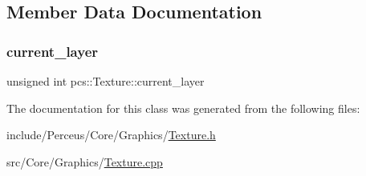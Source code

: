 \subsection{Member Data Documentation}
\mbox{\label{classpcs_1_1Texture_a6308be3376398be4188f5bbed20c5a90}} 
\subsubsection{\texorpdfstring{current\+\_\+layer}{current\_layer}}
{\footnotesize\ttfamily unsigned int pcs\+::\+Texture\+::current\+\_\+layer\hspace{0.3cm}{\ttfamily [private]}}



The documentation for this class was generated from the following files\+:\begin{DoxyCompactItemize}
\item 
include/\+Perceus/\+Core/\+Graphics/\hyperlink{Texture_8h}{Texture.\+h}\item 
src/\+Core/\+Graphics/\hyperlink{Texture_8cpp}{Texture.\+cpp}\end{DoxyCompactItemize}
